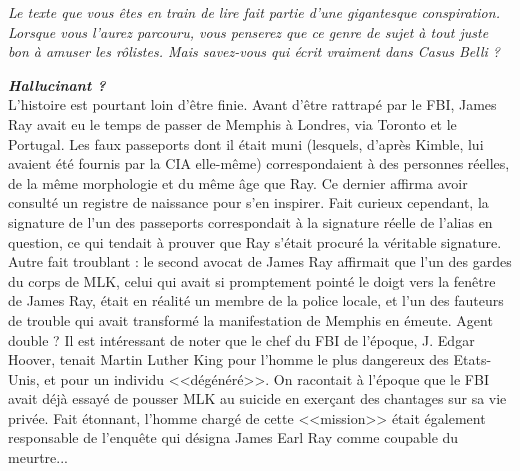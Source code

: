 \documentclass[11pt,twoside,a4paper]{article}
\begin{document}
\begin{multicols*}{2}
\begin{center} \begin{minipage}[ht]{0.30\textwidth}
	\emph{Le texte que vous {\^e}tes en train de lire fait partie d'une gigantesque conspiration. Lorsque vous l'aurez parcouru, vous penserez que ce genre de sujet {\`a} tout juste bon {\`a} amuser les r{\^o}listes. Mais savez-vous qui {\'e}crit vraiment dans Casus Belli ?}~\\
\end{minipage} \end{center}

\textbf{\textit{\large Hallucinant ?}}~\\
L'histoire est pourtant loin d'{\^e}tre finie. Avant d'{\^e}tre rattrap{\'e} par le FBI, James Ray avait eu le temps de passer de Memphis {\`a} Londres, via Toronto et le Portugal. Les faux passeports dont il {\'e}tait muni (lesquels, d'apr{\`e}s Kimble, lui avaient {\'e}t{\'e} fournis par la CIA elle-m{\^e}me) correspondaient {\`a} des personnes r{\'e}elles, de la m{\^e}me morphologie et du m{\^e}me {\^a}ge que Ray. Ce dernier affirma avoir consult{\'e} un registre de naissance pour s'en inspirer. Fait curieux cependant, la signature de l'un des passeports correspondait {\`a} la signature r{\'e}elle de l'alias en question, ce qui tendait {\`a} prouver que Ray s'{\'e}tait procur{\'e} la v{\'e}ritable signature. Autre fait troublant : le second avocat de James Ray affirmait que l'un des gardes du corps de MLK, celui qui avait si promptement point{\'e} le doigt vers la fen{\^e}tre de James Ray, {\'e}tait en r{\'e}alit{\'e} un membre de la police locale, et l'un des fauteurs de trouble qui avait transform{\'e} la manifestation de Memphis en {\'e}meute. Agent double ? Il est int{\'e}ressant de noter que le chef du FBI de l'{\'e}poque, J. Edgar Hoover, tenait Martin Luther King pour l'homme le plus dangereux des Etats-Unis, et pour un individu <<d{\'e}g{\'e}n{\'e}r{\'e}>>. On racontait {\`a} l'{\'e}poque que le FBI avait d{\'e}j{\`a} essay{\'e} de pousser MLK au suicide en exer\c{c}ant des chantages sur sa vie priv{\'e}e. Fait {\'e}tonnant, l'homme charg{\'e} de cette <<mission>> {\'e}tait {\'e}galement responsable de l'enqu{\^e}te qui d{\'e}signa James Earl Ray comme coupable du meurtre...

\vfill


\end{multicols*}
\end{document}
